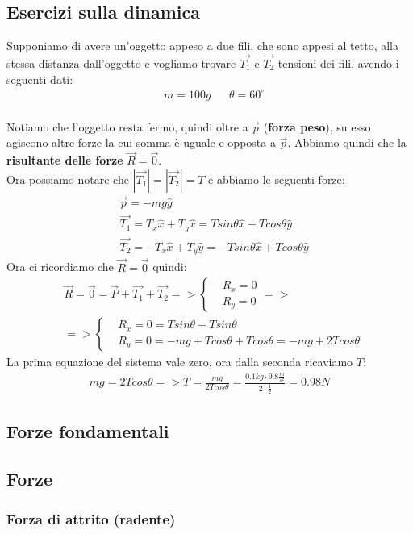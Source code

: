   \subsection{Esercizi sulla dinamica}
    Supponiamo di avere un'oggetto appeso a due fili, che sono appesi al tetto, alla stessa distanza dall'oggetto e vogliamo trovare $\vec{T_1}$ e $\vec{T_2}$ tensioni dei fili, avendo i seguenti dati:
    \begin{align*}
      &m=100g&&\theta=60^{\circ}\\
    \end{align*}


    Notiamo che l'oggetto resta fermo, quindi oltre a $\vec{p}$ (\textbf{forza peso}), su esso agiscono altre forze la cui somma è uguale e opposta a $\vec{p}$. Abbiamo quindi che la \textbf{risultante delle forze} $\vec{R}=\vec{0}$.\\
    Ora possiamo notare che $|\vec{T_1}|=|\vec{T_2}|=T$ e abbiamo le seguenti forze:
    \begin{align*}
      &\vec{p}=-mg\hat{y}\\
      &\vec{T_1}=T_x\hat{x}+T_y\hat{x}=Tsin\theta \hat{x}+Tcos\theta \hat{y}\\
      &\vec{T_2}=-T_x\hat{x}+T_y\hat{y}=-Tsin\theta \hat{x}+Tcos\theta \hat{y}
    \end{align*}
    Ora ci ricordiamo che $\vec{R}=\vec{0}$ quindi:
    \begin{align*}
      &\vec{R}=\vec{0}=\vec{P}+\vec{T_1}+\vec{T_2}=>
      \begin{cases}
        &R_x=0\\
        &R_y=0
      \end{cases}=>\\
      &=>\begin{cases}
        &R_x=0=Tsin\theta-Tsin\theta\\
        &R_y=0=-mg+Tcos\theta+Tcos\theta=-mg+2Tcos\theta
      \end{cases}
    \end{align*}
    La prima equazione del sistema vale zero, ora dalla seconda ricaviamo $T$:
    \begin{align*}
    mg=2Tcos\theta=>T=\frac{mg}{2Tcos\theta}=\frac{0.1kg\cdot 9.8\frac{m}{s^2}}{2\cdot\frac{1}{2}}=0.98N
    \end{align*}

    \subsection{Forze fondamentali}






    \subsection{Forze}

        \subsubsection{Forza di attrito (radente)}
